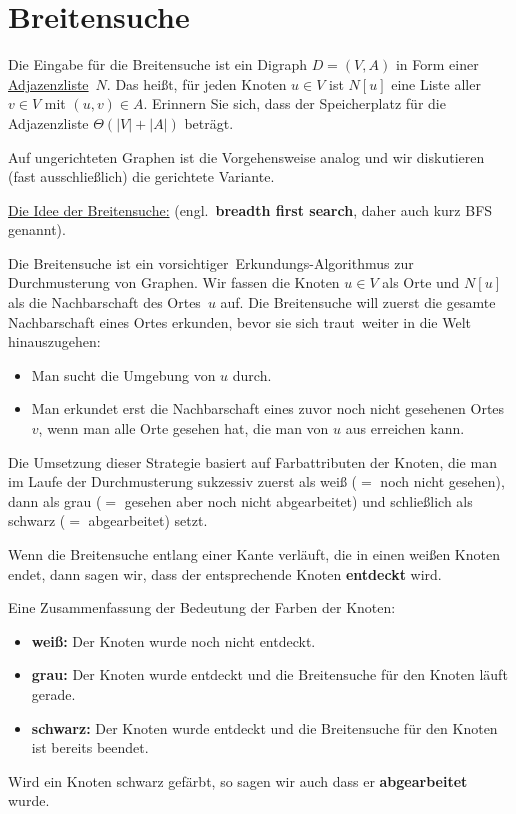 \section{Breitensuche}


\begin{bem}
Die Eingabe für die Breitensuche ist ein Digraph $D=(V,A)$ in Form einer \underline{Adjazenzliste}~$N$.
Das heißt, für jeden Knoten $u \in V$ ist $N[u]$ eine Liste aller $v \in V$ mit $(u,v) \in A$.
Erinnern Sie sich, dass der Speicherplatz für die Adjazenzliste $\Theta(|V|+|A|)$ beträgt.

Auf ungerichteten Graphen ist die Vorgehensweise analog und wir diskutieren (fast ausschließlich) die gerichtete Variante.
\end{bem}


\begin{bem} 
\underline{Die Idee der Breitensuche:} (engl.~\textbf{breadth first search}, daher auch kurz BFS genannt).

Die Breitensuche ist ein \glqq vorsichtiger\grqq\ Erkundungs-Algorithmus zur Durchmusterung von Graphen.
Wir fassen die Knoten $u \in V$ als Orte und $N[u]$ als die Nachbarschaft des Ortes~$u$ auf.
Die Breitensuche will zuerst die gesamte Nachbarschaft eines Ortes erkunden, bevor sie sich \glqq traut\grqq\ weiter in die Welt hinauszugehen:
\begin{itemize} 
 \item Man sucht die Umgebung von $u$ durch. 
 \item Man erkundet erst die Nachbarschaft eines zuvor noch nicht gesehenen Ortes~$v$, wenn man alle Orte gesehen hat, die man von $u$ aus erreichen kann. 
\end{itemize} 
%
Die Umsetzung dieser Strategie basiert auf Farbattributen der Knoten, die man im Laufe der Durchmusterung sukzessiv zuerst als weiß ($=$ noch nicht gesehen), dann als grau ($=$ gesehen aber noch nicht abgearbeitet) und schließlich als schwarz ($=$ abgearbeitet) setzt. 
\end{bem}


\begin{defn}
Wenn die Breitensuche entlang einer Kante verläuft, die in einen weißen Knoten endet, dann sagen wir, dass der entsprechende Knoten \textbf{entdeckt} wird.

\noindent Eine Zusammenfassung der Bedeutung der Farben der Knoten:
\begin{itemize}
	\item[] {\bfseries weiß:} Der Knoten wurde noch nicht entdeckt. 
	\item[] {\bfseries grau:} Der Knoten wurde entdeckt und die Breitensuche für den Knoten läuft gerade.
	\item[] {\bfseries schwarz:} Der Knoten wurde entdeckt und die Breitensuche für den Knoten ist bereits beendet.
\end{itemize}

\noindent Wird ein Knoten schwarz gefärbt, so sagen wir auch dass er \textbf{abgearbeitet} wurde.
\end{defn}


